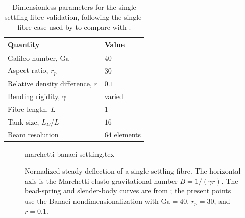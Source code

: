 \begin{table}[H]
    \centering
    \begin{tabular}{ll}
        Quantity                           & Value           \\ \hline
        Galileo number, \(\mathrm{Ga}\)    & \(40\)          \\
        Aspect ratio, \(r_p\)              & \(30\)          \\
        Relative density difference, \(r\) & \(0.1\)         \\
        Bending rigidity, \(\gamma\)       & varied          \\
        Fibre length, \(L\)                & \(1\)           \\
        Tank size, \(L_\Omega/L\)          & \(16\)          \\
        Beam resolution                    & \(64\) elements \\
    \end{tabular}
    \caption{Dimensionless parameters for the single settling fibre validation,
        following the single-fibre case used by
        \textcite{banaei_inertial_2020} to compare with
        \textcite{marchetti_deformation_2018}.}
    \label{tab:single-settling-fibre-setup}
\end{table}

\begin{figure}[t]
    \centering
    {marchetti-banaei-settling.tex}
    \caption{Normalized steady deflection of a single settling fibre. The
        horizontal axis is the Marchetti elasto-gravitational number
        \(B=1/(\gamma r)\). The bead-spring and slender-body curves are from
        \textcite{marchetti_deformation_2018}; the present points use the
        Banaei nondimensionalization with \(\mathrm{Ga}=40\), \(r_p=30\), and
        \(r=0.1\).}
    \label{fig:marchetti-banaei-settling}
\end{figure}
